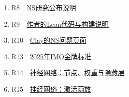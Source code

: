 \documentclass[UTF8,a4paper,11pt,fontset=fandol]{ctexart}
\begin{document}
\begin{enumerate}[label={},leftmargin=0pt,itemsep=6pt]

\item R8　\href{https://openai.com/index/navier-stokes-solution/}{NS研究公布说明}

\item R9　\href{https://github.com/openai/NavierStokesAndEuler}{作者的Lean代码与构建说明}

\item R10　\href{https://www.claymath.org/millennium/navier-stokes-equation/}{Clay的NS问题页面}

\item R13　\href{https://deepmind.google/blog/advanced-version-of-gemini-with-deep-think-officially-achieves-gold-medal-standard-at-the-international-mathematical-olympiad/}{2025年IMO金牌标准}

\item R14　\href{https://developers.google.com/machine-learning/crash-course/neural-networks/nodes-hidden-layers}{神经网络：节点、权重与隐藏层}

\item R15　\href{https://developers.google.com/machine-learning/crash-course/neural-networks/activation-functions}{神经网络：激活函数}

\end{enumerate}
\end{document}
